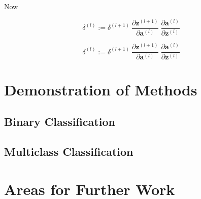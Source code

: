 \documentclass{article}[11pt]
\begin{document}
        
        Now
        
        
        
        $$
        \delta^{(l)} :=
        \delta^{(l+1)} \
        \frac{\partial \mathbf{z}^{(l+1)}}{\partial \mathbf{a}^{(l)}} \
        \frac{\partial \mathbf{a}^{(l)}}{\partial \mathbf{z}^{(l)}} \
        $$
        
        
        
        $$
        \delta^{(l)} :=
            \delta^{(l+1)} \
            \frac{\partial \mathbf{z}^{(l+1)}}{\partial \mathbf{a}^{(l)}} \
            \frac{\partial \mathbf{a}^{(l)}}{\partial \mathbf{z}^{(l)}} \
        $$
        
        
        
        
        
        






\section{Demonstration of Methods}
\label{sec:demos}

    \subsection{Binary Classification}
    
    \subsection{Multiclass Classification}
    



\section{Areas for Further Work}    





\end{document}
